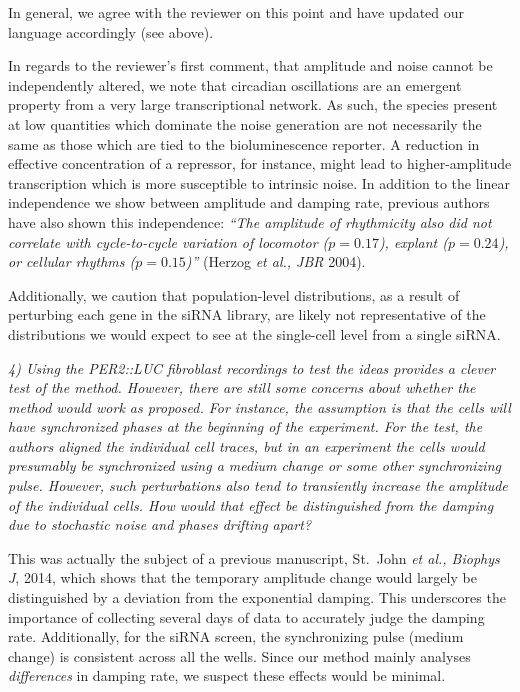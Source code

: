\documentclass[11pt, letterpaper]{article}
\newenvironment{reviewer}{\itshape\color{gray}}{}
\begin{document}
In general, we agree with the reviewer on this point and have updated our language accordingly (see above).

In regards to the reviewer's first comment, that amplitude and noise cannot be independently altered, we note that circadian oscillations are an emergent property from a very large transcriptional network.
As such, the species present at low quantities which dominate the noise generation are not necessarily the same as those which are tied to the bioluminescence reporter.
A reduction in effective concentration of a repressor, for instance, might lead to higher-amplitude transcription which is more susceptible to intrinsic noise.
In addition to the linear independence we show between amplitude and damping rate, previous authors have also shown this independence: {\itshape ``The amplitude of rhythmicity also did not correlate with cycle-to-cycle variation of locomotor ($p = 0.17$), explant ($p = 0.24$), or cellular rhythms ($p = 0.15$)''} (Herzog {\itshape et al., JBR} 2004).

Additionally, we caution that population-level distributions, as a result of perturbing each gene in the siRNA library, are likely not representative of the distributions we would expect to see at the single-cell level from a single siRNA.



\begin{reviewer}
4) Using the PER2::LUC fibroblast recordings to test the ideas provides a clever test of the method. However, there are still some concerns about whether the method would work as proposed. For instance, the assumption is that the cells will have synchronized phases at the beginning of the experiment. For the test, the authors aligned the individual cell traces, but in an experiment the cells would presumably be synchronized using a medium change or some other synchronizing pulse. However, such perturbations also tend to transiently increase the amplitude of the individual cells. How would that effect be distinguished from the damping due to stochastic noise and phases drifting apart?
\end{reviewer}

This was actually the subject of a previous manuscript, St.\ John {\itshape et al., Biophys J}, 2014, which shows that the temporary amplitude change would largely be distinguished by a deviation from the exponential damping.
This underscores the importance of collecting several days of data to accurately judge the damping rate.
Additionally, for the siRNA screen, the synchronizing pulse (medium change) is consistent across all the wells.
Since our method mainly analyses {\itshape differences} in damping rate, we suspect these effects would be minimal.
\end{document}
